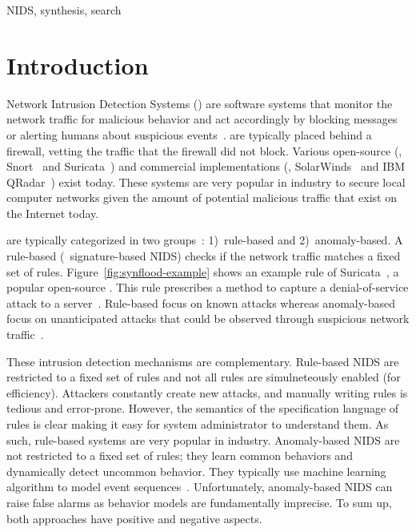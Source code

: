 \documentclass[conference]{IEEEtran}
\begin{document}
\begin{IEEEkeywords}
NIDS, synthesis, search
\end{IEEEkeywords}

\section{Introduction}

Network Intrusion Detection Systems (\nids{}) are software systems
that monitor the network traffic for malicious behavior and act
accordingly by blocking messages or alerting humans about suspicious
events~\cite{Mitchell:2014:SID:2597757.2542049}. \nids{} are typically
placed behind a firewall, vetting the traffic that the firewall did
not block. Various open-source (\eg{}, Snort~\cite{snort} and
Suricata~\cite{suricata}) and commercial implementations (\eg{},
SolarWinds~\cite{solarwinds} and IBM QRadar~\cite{qradar}) exist
today. These systems are very popular in industry to secure local
computer networks given the amount of potential malicious traffic that
exist on the Internet today.

\sloppy \nids{} are typically categorized in two
groups~\cite{kumar2007survey}: 1)~rule-based and 2)~anomaly-based. A
rule-based \nids{} (\aka\ signature-based NIDS) checks if the network
traffic matches a fixed set of
rules. Figure~\ref{fig:synflood-example} shows an example rule of
Suricata~\cite{suricata}, a popular open-source \nids{}. This rule
prescribes a method to capture a denial-of-service attack to a
server~\cite{Douligeris:2004:DAD:987153.987158}. Rule-based \nids{} focus on known attacks whereas
anomaly-based \nids{} focus on unanticipated attacks that could be
observed through suspicious network
traffic~\cite{kumar2007survey,Mitchell:2014:SID:2597757.2542049,cordy-etal-issta19}.

These intrusion detection mechanisms are complementary. Rule-based
NIDS are restricted to a fixed set of rules and not all rules are
simulneteously enabled (for efficiency). Attackers constantly create
new attacks, and manually writing rules is tedious and
error-prone. However, the semantics of the specification language of
rules is clear making it easy for system administrator to understand
them. As such, rule-based systems are very popular in industry.
Anomaly-based NIDS are not restricted to a fixed set of rules; they
learn common behaviors and dynamically detect uncommon behavior. They
typically use machine learning algorithm to model event
sequences~\cite{7579764}. Unfortunately, anomaly-based NIDS can raise
false alarms as behavior models are fundamentally imprecise. To sum
up, both approaches have positive and negative aspects.
\end{document}
